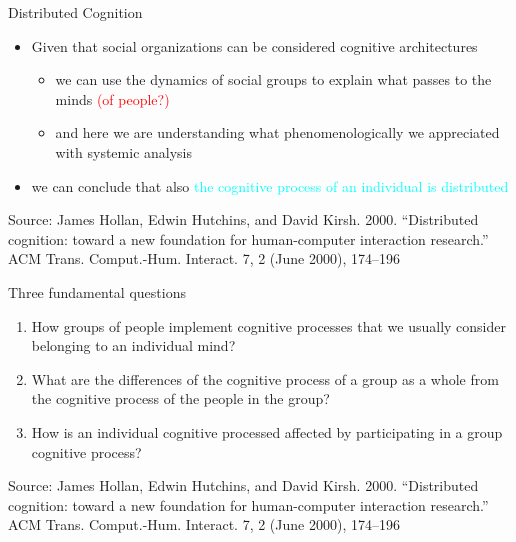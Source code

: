 \documentclass{beamer}
\begin{document}
\begin{frame}
{\centerline{Distributed Cognition}}

\begin{itemize}
\item Given that social organizations can be considered cognitive architectures
\begin{itemize}
    \item we can use the dynamics of social groups to explain what passes to the minds \textcolor{red}{(of people?)} 
    \item and here we are understanding what phenomenologically we appreciated with systemic analysis
 \end{itemize}
    \item we can conclude that also \textcolor{cyan}{the cognitive process of an individual is distributed}  
\end{itemize}

\begin{center}
    \tiny{Source: James Hollan, Edwin Hutchins, and David Kirsh. 2000. ``Distributed cognition: toward a new foundation for human-computer interaction research.'' ACM Trans. Comput.-Hum. Interact. 7, 2 (June 2000), 174–196}
\end{center}

\end{frame}

\begin{frame}
{\centerline{Three fundamental questions}}

\begin{enumerate}
\item How groups of people implement cognitive processes that we usually consider belonging to an individual mind?\newline
    \item What are the differences of the cognitive process of a group as a whole from the cognitive process of the people in the group?\newline
    \item How is an individual cognitive processed affected by participating in a group cognitive process?\newline
\end{enumerate}

\begin{center}
    \tiny{Source: James Hollan, Edwin Hutchins, and David Kirsh. 2000. ``Distributed cognition: toward a new foundation for human-computer interaction research.'' ACM Trans. Comput.-Hum. Interact. 7, 2 (June 2000), 174–196}
\end{center}

\end{frame}
\end{document}
